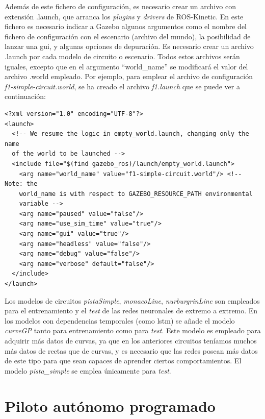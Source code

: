 Además de este fichero de configuración, es necesario crear un archivo con extensión .launch, que arranca los \textit{plugins} y \textit{drivers} de ROS-Kinetic. En este fichero es necesario indicar a Gazebo algunos argumentos como el nombre del fichero de configuración con el escenario (archivo del mundo), la posibilidad de lanzar una \acrshort{gui}, y algunas opciones de depuración. Es necesario crear un archivo .launch por cada modelo de circuito o escenario. Todos estos archivos serán iguales, excepto que en el argumento ``world\_name'' se modificará el valor del archivo .world empleado. Por ejemplo, para emplear el archivo de configuración \textit{f1-simple-circuit.world}, se ha creado el archivo \textit{f1.launch} que se puede ver a continuación:\\

\vspace{20pt}
\begin{lstlisting}[frame=single]
<?xml version="1.0" encoding="UTF-8"?>
<launch>
  <!-- We resume the logic in empty_world.launch, changing only the name 
  of the world to be launched -->
  <include file="$(find gazebo_ros)/launch/empty_world.launch">
    <arg name="world_name" value="f1-simple-circuit.world"/> <!-- Note: the 
    world_name is with respect to GAZEBO_RESOURCE_PATH environmental
    variable -->
    <arg name="paused" value="false"/>
    <arg name="use_sim_time" value="true"/>
    <arg name="gui" value="true"/>
    <arg name="headless" value="false"/>
    <arg name="debug" value="false"/>
    <arg name="verbose" default="false"/>
  </include>  
</launch>
\end{lstlisting}

Los modelos de circuitos \textit{pistaSimple}, \textit{monacoLine}, \textit{nurburgrinLine} son empleados para el entrenamiento y el \textit{test} de las redes neuronales de extremo a extremo. En los modelos con dependencias temporales (como \acrshort{lstm}) se añade el modelo \textit{curveGP} tanto para entrenamiento como para \textit{test}. Este modelo es empleado para adquirir más datos de curvas, ya que en los anteriores circuitos teníamos muchos más datos de rectas que de curvas, y es necesario que las redes posean más datos de este tipo para que sean capaces de aprender ciertos comportamientos. El modelo \textit{pista\_simple} se emplea únicamente para \textit{test}.\\



\section{Piloto autónomo programado}\label{piloto}

